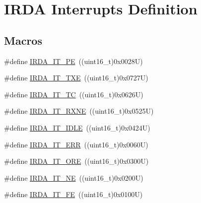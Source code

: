 \hypertarget{group___i_r_d_a___interrupt__definition}{}\section{I\+R\+DA Interrupts Definition}
\label{group___i_r_d_a___interrupt__definition}
\subsection*{Macros}
\begin{DoxyCompactItemize}
\item 
\#define \hyperlink{group___i_r_d_a___interrupt__definition_ga1d2b4b601ece8f1ab0b2542412bb2533}{I\+R\+D\+A\+\_\+\+I\+T\+\_\+\+PE}~((uint16\+\_\+t)0x0028\+U)
\item 
\#define \hyperlink{group___i_r_d_a___interrupt__definition_ga5e81e9fd3d52bafcf21281c10d2ca257}{I\+R\+D\+A\+\_\+\+I\+T\+\_\+\+T\+XE}~((uint16\+\_\+t)0x0727\+U)
\item 
\#define \hyperlink{group___i_r_d_a___interrupt__definition_gadd3e4b796b67db171ca04c5297d4e667}{I\+R\+D\+A\+\_\+\+I\+T\+\_\+\+TC}~((uint16\+\_\+t)0x0626\+U)
\item 
\#define \hyperlink{group___i_r_d_a___interrupt__definition_ga8f2de9c6c3cccfb2de0277ce10f23b13}{I\+R\+D\+A\+\_\+\+I\+T\+\_\+\+R\+X\+NE}~((uint16\+\_\+t)0x0525\+U)
\item 
\#define \hyperlink{group___i_r_d_a___interrupt__definition_ga32dfb69029c5576d82feb59129d11000}{I\+R\+D\+A\+\_\+\+I\+T\+\_\+\+I\+D\+LE}~((uint16\+\_\+t)0x0424\+U)
\item 
\#define \hyperlink{group___i_r_d_a___interrupt__definition_ga5649210cc5343a80483178849a11ac66}{I\+R\+D\+A\+\_\+\+I\+T\+\_\+\+E\+RR}~((uint16\+\_\+t)0x0060\+U)
\item 
\#define \hyperlink{group___i_r_d_a___interrupt__definition_ga25949256f4317d4520cc5a9f3a18b794}{I\+R\+D\+A\+\_\+\+I\+T\+\_\+\+O\+RE}~((uint16\+\_\+t)0x0300\+U)
\item 
\#define \hyperlink{group___i_r_d_a___interrupt__definition_gabc87f825339853122d5cabb5c6ca462b}{I\+R\+D\+A\+\_\+\+I\+T\+\_\+\+NE}~((uint16\+\_\+t)0x0200\+U)
\item 
\#define \hyperlink{group___i_r_d_a___interrupt__definition_gac193cb9027e7425c022a160f172bf8b7}{I\+R\+D\+A\+\_\+\+I\+T\+\_\+\+FE}~((uint16\+\_\+t)0x0100\+U)
\end{DoxyCompactItemize}


